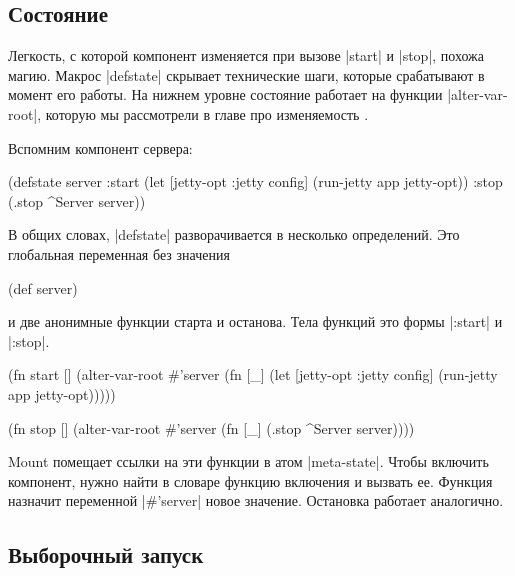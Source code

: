 \subsection{Состояние}

Легкость, с которой компонент изменяется при вызове \spverb|start| и
\spverb|stop|, похожа магию. Макрос \spverb|defstate| скрывает технические шаги,
которые срабатывают в момент его работы. На нижнем уровне состояние работает на
функции \spverb|alter-var-root|, которую мы рассмотрели в главе про
изменяемость .

Вспомним компонент сервера:

\begin{english}
  \begin{clojure}
(defstate server
  :start (let [{jetty-opt :jetty} config]
           (run-jetty app jetty-opt))
  :stop (.stop ^Server server))
  \end{clojure}
\end{english}

В общих словах, \spverb|defstate| разворачивается в несколько определений. Это
глобальная переменная без значения

\begin{english}
  \begin{clojure}
(def server)
  \end{clojure}
\end{english}

\noindent
и две анонимные функции старта и останова. Тела функций это формы
\spverb|:start| и \spverb|:stop|.

\begin{english}
  \begin{clojure}
(fn start []
  (alter-var-root #'server
   (fn [_]
     (let [{jetty-opt :jetty} config]
       (run-jetty app jetty-opt)))))

(fn stop []
  (alter-var-root #'server
   (fn [_]
     (.stop ^Server server))))
  \end{clojure}
\end{english}

Mount помещает ссылки на эти функции в атом \spverb|meta-state|. Чтобы
включить компонент, нужно найти в словаре функцию включения и вызвать
ее. Функция назначит переменной \spverb|#'server| новое значение. Остановка
работает аналогично.

\subsection{Выборочный запуск}

